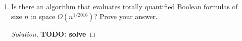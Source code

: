 \documentclass[usletter]{article}
\newcommand {\family}[1]       {\ensuremath{\textnormal{\textsf{#1}}}}
\newcommand{\todo}[1]{{\large \textbf{TODO: #1}}}
\begin{document}
\begin{enumerate}
\begin{proof}
    $\subseteq^1$ holds because any TM can visit at most $T(n)$ cells, if it
    runs in time $T(n)$.

    $\subseteq^2$ holds directly because of Savitch's Theorem \cite{SAVITCH1970}.

    $\subsetneq^3$ holds directly because of Space Hierarchy Theorem.

    $\subseteq^4$ holds by the definition of \family{PSPACE}.
  \end{proof}

  \item Is there an algorithm that evaluates totally quantified Boolean formulas
        of size $n$ in space $O(n^{1/2016})$? Prove your answer.
  \begin{proof}[Solution]
    \todo{solve}
  \end{proof}
\end{enumerate}



\end{document}
